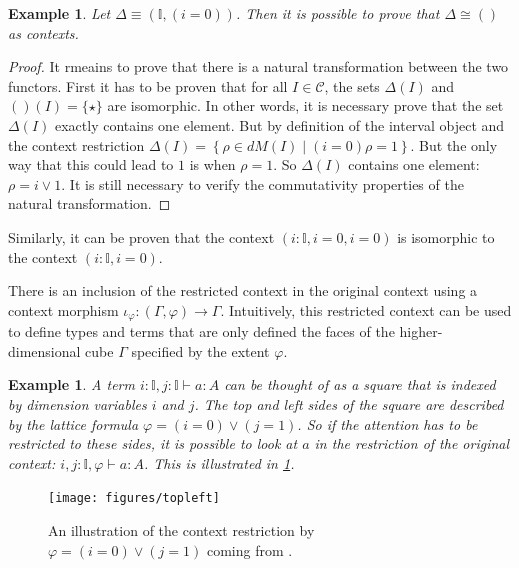 \documentclass[12pt,a4paper,twoside,xetex]{book}
\newtheorem{example}[theorem]{Example}
\begin{document}
\begin{example}
Let $\Delta \equiv (\mathbb{I}, (i=0))$. Then it is possible to prove that 
$\Delta \cong ()$ as contexts.
\end{example} 

\begin{proof}
It rmeains to prove that there is a natural transformation between the 
two functors. First it has to be proven that for all $I \in \mathcal{C}$, the 
sets $\Delta (I)$ and $()(I)=\{\star \}$ are isomorphic. In other words, it is 
necessary prove that the set $\Delta (I)$ exactly contains one element. But by 
definition of the interval object and the context restriction $\Delta (I) = 
\left\{  \rho \in dM(I) \mid (i=0) \rho = 1 \right\}$. But the only way that 
this could lead to $1$ is when $\rho = 1$. So $\Delta (I)$ contains one element: 
$\rho = i \vee 1$. It is still necessary to verify the commutativity properties 
of the natural transformation.
\end{proof}
 
 Similarly, it can be proven that the context $(i: \mathbb{I}, i=0, i=0)$ is 
isomorphic to the context $(i : \mathbb{I}, i = 0)$.

 
 
There is an inclusion of the restricted context in the original context using a 
context morphism $\iota_{\varphi} : (\Gamma , \varphi ) \rightarrow \Gamma $. 
Intuitively, this restricted context can be used to define types and terms that 
are only defined the faces of the higher-dimensional cube $\Gamma$ specified by 
the extent $\varphi$.  

\begin{example}
A term $i : \mathbb{I}, j: \mathbb{I} \vdash a : A$ can be thought of as a 
square that is indexed by dimension variables $i$ and $j$. The top and left 
sides of the square are described by the lattice formula $\varphi = (i=0) \vee 
(j=1)$. So if the attention has to be restricted to these sides, it is possible 
to look at $a$ in the restriction of the original context: $i , j : \mathbb{I}, 
 \varphi \vdash a : A$. This is illustrated in \cref{topleft}.
\end{example}

\begin{figure}
\centering
\texttt{[image: figures/topleft]}
\caption{An illustration of the context restriction by $\varphi = (i=0) \vee 
(j=1)$ coming from \cite{Orton2019}.\label{topleft}}
\end{figure}
\end{document}
